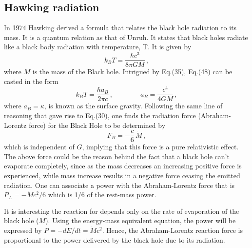 \documentclass[12pt]{article}
\begin{document}
\subsection{{Hawking radiation}}

In 1974 Hawking  derived a formula that relates the black hole radiation to its mass. It is a quantum relation as that of Unruh. It states that black holes radiate like a black body radiation with temperature, T. It is given by {\cite{hawking}}
\begin{equation}
k_BT=\frac{\hbar c^3}{8\pi GM}\,,
\end{equation}
where $M$ is the mass of the Black hole. Intrigued by Eq.(35), Eq.(48) can be casted in the form
\begin{equation}
k_BT=\frac{\hbar a_B}{2\pi c}\,,\qquad\qquad a_B=\frac{c^4}{4 G M}\,,
\end{equation}
where $a_B=\kappa$, is known as the surface gravity. Following the same line of reasoning that gave rise to Eq.(30), one finds the radiation force (Abraham-Lorentz force) for the Black Hole to be determined by
\begin{equation}
F_B=-\frac{c}{6}\, \dot M\,,
\end{equation}
which is independent of $G$, implying that this force is a pure relativistic effect. The above force could be the reason behind the fact that a black hole can't evaporate completely, since as the mass decreases an increasing positive force is experienced, while mass increase results in a negative force ceasing the emitted radiation. One can associate a power with the Abraham-Lorentz force that is $P_A=-\dot M c^2/6$ which is 1/6 of the rest-mass power.

It is interesting the reaction for depends only on the rate of evaporation of the black hole ($\dot M$). Using the energy-mass equivalent equation, the power will be expressed by $P=-dE/dt=\dot Mc^2$. Hence, the Abraham-Lorentz reaction force is proportional to the power delivered by the black hole due to its radiation.
\end{document}
